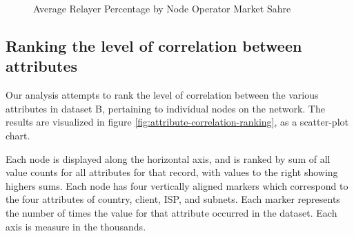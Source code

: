 \documentclass[conference]{IEEEtran}
\begin{document}
\begin{figure}[htbp]
  \centering
  \caption{Average Relayer Percentage by Node Operator Market Sahre}
  \label{fig:average_relayer_percentage_by_percentile}
\end{figure}

\subsection{Ranking the level of correlation between attributes}

Our analysis attempts to rank the level of correlation between the various attributes in dataset B, pertaining to individual nodes on the network.  The results are visualized in figure \ref{fig:attribute-correlation-ranking}, as a scatter-plot chart.

Each node is displayed along the horizontal axis, and is ranked by sum of all value counts for all attributes for that record, with values to the right showing highers sums.  Each node has four vertically aligned markers which correspond to the four attributes of country, client, ISP, and subnets.  Each marker represents the number of times the value for that attribute occurred in the dataset.  Each axis is measure in the thousands.
\end{document}
